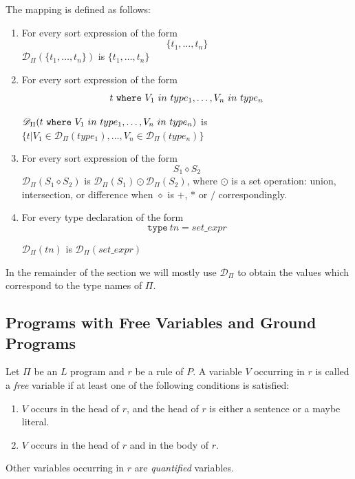 \documentclass[a4paper,10pt]{article}
\begin{document}
\medskip\noindent 
The mapping is defined as follows:

\begin{enumerate}
\item For every sort expression of the form $$\{t_1,\ldots,t_n\}$$   $\mathcal{D}_\Pi(\{t_1,\ldots,t_n\})$ is $ \{t_1,\ldots,t_n\}$
\item For every sort expression of the form   $$t~\mbox{\texttt{where}} ~V_1~in~type_1,\ldots, V_n~in~type_n$$
 
\noindent
$\mathcal{D}_\Pi(t~\mbox{\texttt{where}} ~V_1~in~type_1,\ldots, V_n~in~type_n)$ is $\{t| V_1 \in \mathcal{D}_\Pi(type_1),\ldots, V_n \in \mathcal{D}_\Pi(type_n)\}$ 
\item For every sort expression of the form $$S_1 \diamond S_2$$ 
$\mathcal{D}_\Pi(S_1 \diamond S_2)$ is $ \mathcal{D}_\Pi(S_1) \odot  \mathcal{D}_\Pi(S_2)$, where $\odot$ is a set operation: union, intersection, or difference when $\diamond$ is $+$, $*$ or $/$ correspondingly.

\item For every type declaration of the form $$\texttt{type}~tn = set\_expr$$

$\mathcal{D}_\Pi(tn)$ is $\mathcal{D}_\Pi(set\_expr)$  


\end{enumerate}

\medskip\noindent
In the remainder of the section  we will mostly  use   $\mathcal{D}_\Pi$ to obtain the values  which correspond to the type names of $\Pi$.



\subsection{Programs with Free Variables and Ground Programs}\label{grp}

Let $\Pi$ be an $L$ program and $r$ be a rule of $P$. 
A variable $V$ occurring in  $r$  is called a \textit{free} variable if at least one of the following conditions is satisfied:
\begin{enumerate}
\item $V$ occurs in the  head of $r$, and the head of $r$ is either a sentence or a maybe literal.
\item $V$ occurs in the head of $r$ and in the body of $r$.
\end{enumerate}
Other variables occurring in $r$ are \textit{quantified} variables.
\end{document}
